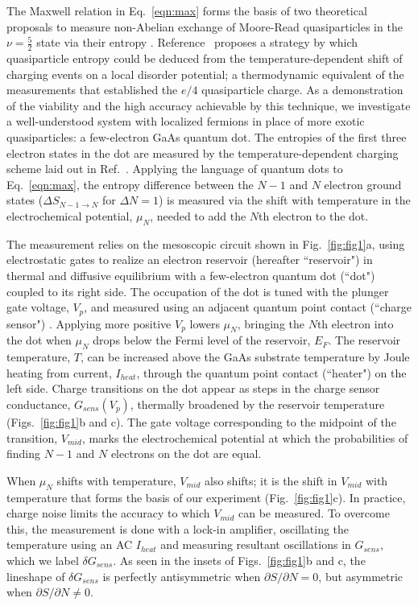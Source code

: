 \documentclass[twocolumn,showpacs,amsmath,amssymb,prl,aps,superscriptaddress]{revtex4-1}
\begin{document}
The Maxwell relation in Eq.~\ref{eqn:max} forms the basis of two theoretical proposals to measure non-Abelian exchange of Moore-Read quasiparticles in  the $\nu = \frac{5}{2}$ state via their entropy \cite{Cooper2009,Ben-Shach2013}.  Reference~ proposes a strategy by which quasiparticle entropy could be deduced from the temperature-dependent shift of charging events on a local disorder potential; a thermodynamic equivalent of the measurements that established the $e/4$ quasiparticle charge\cite{Venkatachalam2011}. As a demonstration of the viability and the high accuracy achievable by this technique, we investigate a well-understood system with localized fermions in place of more exotic quasiparticles: a few-electron GaAs quantum dot. The entropies of the first three electron states in the dot are measured by the temperature-dependent charging scheme laid out in Ref.~.   Applying the language of quantum dots to Eq.~\ref{eqn:max}, the entropy difference between the $N-1$ and $N$ electron ground states ($\Delta S_{N-1\rightarrow N}$ for $\Delta N=1$) is measured via the shift with temperature in the electrochemical potential, $\mu_N$, needed to add the $N$th electron to the dot. 

The measurement relies on the mesoscopic circuit shown in Fig.~\ref{fig:fig1}a, using electrostatic gates to realize an electron reservoir (hereafter ``reservoir") in thermal and diffusive equilibrium with a few-electron quantum dot (``dot") coupled to its right side.  The occupation of the dot is tuned with the plunger gate voltage, $V_p$, and measured using an adjacent quantum point contact (``charge sensor") \cite{Field1993, Staring2007, Thierschmann2015}.  Applying more positive $V_p$ lowers $\mu_N$,  bringing the $N$th electron into the dot when $\mu_{N}$ drops below the Fermi level of the reservoir, $E_F$. The reservoir temperature, $T$, can be increased above the GaAs substrate temperature by Joule heating from current, $I_{heat}$, through the quantum point contact (``heater") on the left side.   Charge transitions on the dot appear as steps in the charge sensor conductance, $G_{sens}(V_p)$, thermally broadened by the reservoir temperature (Figs.~\ref{fig:fig1}b and c).  The gate voltage corresponding to the midpoint of the transition, $V_{mid}$, marks the electrochemical potential at which the probabilities of finding $N-1$ and $N$ electrons on the dot are equal.

When $\mu_N$ shifts with temperature, $V_{mid}$ also shifts; it is the shift in $V_{mid}$ with temperature that forms the basis of our experiment (Fig.~\ref{fig:fig1}c).  In practice, charge noise limits the accuracy to which $V_{mid}$ can be measured. To overcome this, the measurement is done with a lock-in amplifier, oscillating the temperature using an AC $I_{heat}$ and measuring resultant oscillations in $G_{sens}$, which we label $\delta G_{sens}$.  As seen in the insets of Figs.~\ref{fig:fig1}b and c, the lineshape of $\delta G_{sens}$ is perfectly antisymmetric when $\partial S/\partial N=0$, but asymmetric when $\partial S/\partial N \neq 0$.
\end{document}
